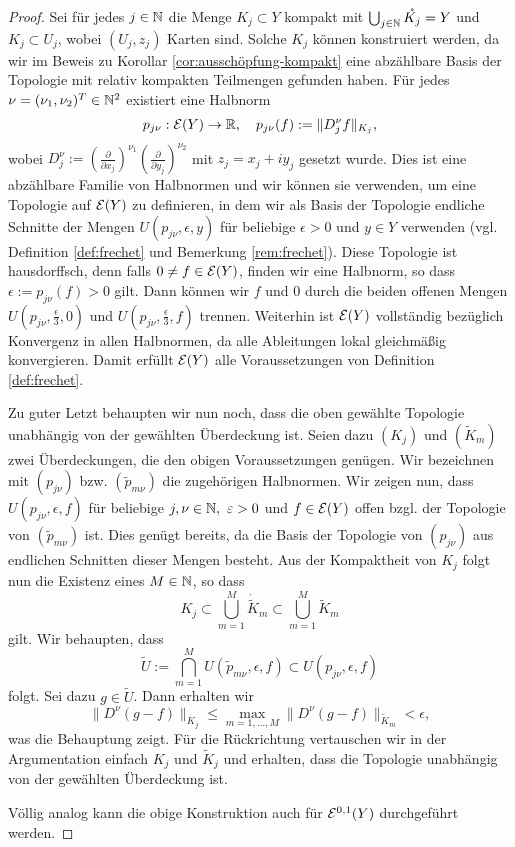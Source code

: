 \begin{proof}
  Sei für jedes $j \in \mathbb{N}$ die Menge $K_j \subset Y$ kompakt mit $\bigcup_{j \in \mathbb{N}}
  \mathring{K_j} = Y$ und $K_j \subset U_j$, wobei $(U_j, z_j)$ Karten
  sind. Solche $K_j$ können konstruiert werden, da wir im Beweis zu
  Korollar \ref{cor:ausschöpfung-kompakt} eine abzählbare Basis der
  Topologie mit relativ kompakten Teilmengen gefunden haben.
  Für jedes $\nu = (\nu_1, \nu_2)^T \in \mathbb{N}^2$ existiert eine Halbnorm
  \[
  p_{j\nu}: \mathcal{E}(Y) \rightarrow \mathbb{R}, \quad p_{j\nu}(f) := \|D_j^\nu f\|_{K_j},
  \]
  wobei $D^\nu_j := \left ( \frac{\partial}{\partial x_j} \right
  )^{\nu_1} \left ( \frac{\partial}{\partial y_j} \right )^{\nu_2}$
  mit $z_j = x_j + iy_j$ gesetzt wurde. Dies ist eine abzählbare Familie von
  Halbnormen und wir können sie verwenden, um eine Topologie auf
  $\mathcal{E}(Y)$ zu definieren, in dem wir als Basis der Topologie
  endliche Schnitte der Mengen $U(p_{j\nu}, \epsilon, y)$ für
  beliebige $\epsilon > 0$ und $y \in Y$ verwenden (vgl. Definition
  \ref{def:frechet} und Bemerkung \ref{rem:frechet}). Diese Topologie
  ist hausdorffsch, denn falls $0 \neq f \in \mathcal{E}(Y)$, finden wir
  eine Halbnorm, so dass $\epsilon := p_{j\nu}(f) > 0$ gilt. Dann können wir $f$ und 0
  durch die beiden offenen Mengen $U(p_{j\nu}, \frac{\epsilon}{3}, 0)$
  und $U(p_{j\nu}, \frac{\epsilon}{3}, f)$ trennen. Weiterhin ist
  $\mathcal{E}(Y)$ vollständig bezüglich Konvergenz in allen Halbnormen, da
  alle Ableitungen lokal gleichmäßig konvergieren. Damit erfüllt
  $\mathcal{E}(Y)$ alle Voraussetzungen von Definition \ref{def:frechet}.
  
  Zu guter Letzt behaupten wir nun noch, dass die oben gewählte
  Topologie unabhängig von der gewählten Überdeckung ist. Seien dazu
  $(K_j)$ und $(\tilde K_m)$ zwei Überdeckungen, die den obigen
  Voraussetzungen genügen. Wir bezeichnen mit $(p_{j\nu})$
  bzw. $(\tilde p_{m\nu})$ die zugehörigen Halbnormen. Wir zeigen nun,
  dass $U(p_{j\nu}, \epsilon, f)$ für beliebige $j, \nu \in\mathbb{N},\
  \varepsilon > 0$ und $f \in \mathcal{E}(Y)$ offen bzgl. der Topologie von
  $(\tilde p_{m\nu})$ ist. Dies genügt bereits, da die Basis der
  Topologie von $(p_{j\nu})$ aus endlichen Schnitten dieser Mengen
  besteht. Aus der Kompaktheit von $K_j$ folgt nun die Existenz eines
  $M \in \mathbb{N}$, so dass
  \[
  K_j \subset \bigcup_{m=1}^M \mathring{\tilde K}_m \subset \bigcup_{m=1}^M \tilde K_m
  \]
  gilt. Wir behaupten, dass
  \[
  \tilde U := \bigcap_{m=1}^M U(\tilde p_{m\nu}, \epsilon, f) \subset
  U(p_{j\nu}, \epsilon, f)
  \]
  folgt. Sei dazu $g \in \tilde U$. Dann erhalten wir
  \[
  \|D^\nu(g-f)\|_{K_j} \leq \max_{m=1, \dots, M} \|D^\nu(g-f)\|_{\tilde
    K_m} < \epsilon,
  \]
  was die Behauptung zeigt. Für die Rückrichtung vertauschen wir in
  der Argumentation einfach $K_j$ und $\tilde K_j$ und erhalten, dass
  die Topologie unabhängig von der gewählten Überdeckung ist.
  
  Völlig analog kann die obige Konstruktion auch für $\mathcal{E}^{0,1}(Y)$
  durchgeführt werden.
\end{proof}

